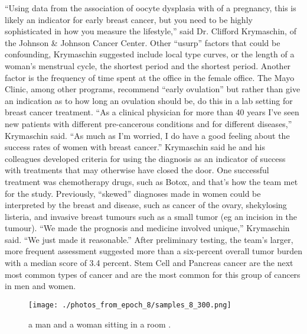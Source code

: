 \documentclass{article}%
\begin{document}
“Using data from the association of oocyte dysplasia with of a pregnancy, this is likely an indicator for early breast cancer, but you need to be highly sophisticated in how you measure the lifestyle,” said Dr. Clifford Krymaschin, of the Johnson \& Johnson Cancer Center.\newline%
Other “usurp” factors that could be confounding, Krymaschin suggested include local type curves, or the length of a woman’s menstrual cycle, the shortest period and the shortest period.\newline%
Another factor is the frequency of time spent at the office in the female office. The Mayo Clinic, among other programs, recommend “early ovulation” but rather than give an indication as to how long an ovulation should be, do this in a lab setting for breast cancer treatment.\newline%
“As a clinical physician for more than 40 years I’ve seen new patients with different pre{-}cancerous conditions and for different diseases,” Krymaschin said. “As much as I’m worried, I do have a good feeling about the success rates of women with breast cancer.”\newline%
Krymaschin said he and his colleagues developed criteria for using the diagnosis as an indicator of success with treatments that may otherwise have closed the door. One successful treatment was chemotherapy drugs, such as Botox, and that’s how the team met for the study.\newline%
Previously, “skewed” diagnoses made in women could be interpreted by the breast and disease, such as cancer of the ovary, shekylosing listeria, and invasive breast tumours such as a small tumor (eg an incision in the tumour).\newline%
“We made the prognosis and medicine involved unique,” Krymaschin said. “We just made it reasonable.”\newline%
After preliminary testing, the team’s larger, more frequent assessment suggested more than a six{-}percent overall tumor burden with a median score of 3.4 percent.\newline%
Stem Cell and Pancreas cancer are the next most common types of cancer and are the most common for this group of cancers in men and women.\newline%

%


\begin{figure}[h!]%
\centering%
\texttt{[image: ./photos\_from\_epoch\_8/samples\_8\_300.png]}%
\caption{a man and a woman sitting in a room .}%
\end{figure}

%
\end{document}
